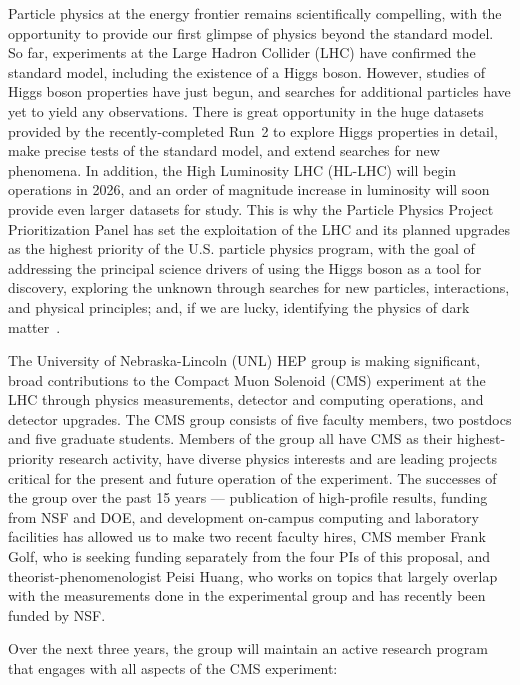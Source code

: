 Particle physics at the energy frontier remains scientifically compelling, with the opportunity to provide our first glimpse of physics beyond the standard model.  So far, experiments at the Large Hadron Collider (LHC) have confirmed the standard model, including the existence of a Higgs boson.  However, studies of Higgs boson properties have just begun, and searches for additional particles have yet to yield any observations. There is great opportunity in the huge datasets provided by the recently-completed Run~2 to explore Higgs properties in detail, make precise tests of the standard model, and extend searches for new phenomena.  In addition, the High Luminosity LHC (HL-LHC) will begin operations in 2026, and an order of magnitude increase in luminosity will soon provide even larger datasets for study.  This is why the Particle Physics Project Prioritization Panel has set the exploitation of the LHC and its planned upgrades as the highest priority of the U.S. particle physics program, with the goal of addressing the principal science drivers of using the Higgs boson as a tool for discovery, exploring the unknown through searches for new particles, interactions, and physical principles; and, if we are lucky, identifying the physics of dark matter~\cite{bib:P5}.

The University of Nebraska-Lincoln (UNL) HEP group is making significant, broad contributions to the Compact Muon Solenoid (CMS) experiment at the LHC through physics measurements, detector and computing operations, and detector upgrades. The CMS group consists of five faculty members, two postdocs and five graduate students. Members of the group all have CMS as their highest-priority research activity, have diverse physics interests and are leading projects critical for the present and future operation of the experiment.  The successes of the group over the past 15 years — publication of high-profile results, funding from NSF and DOE, and development on-campus computing and laboratory facilities has allowed us to make two recent faculty hires, CMS member Frank Golf, who is seeking funding separately from the four PIs of this proposal, and theorist-phenomenologist Peisi Huang, who works on topics that largely overlap with the measurements done in the experimental group and has recently been funded by NSF.

Over the next three years, the group will maintain an active research program that engages with all aspects of the CMS experiment:

